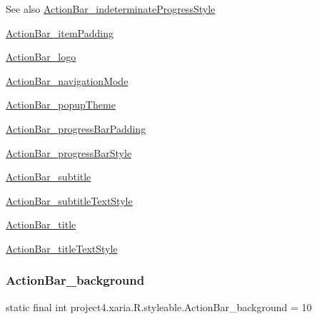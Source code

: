 \begin{DoxySeeAlso}{See also}
\hyperlink{classproject4_1_1xaria_1_1R_1_1styleable_a7b820690f429621509300f757ddbd3da}{Action\+Bar\+\_\+indeterminate\+Progress\+Style} 

\hyperlink{classproject4_1_1xaria_1_1R_1_1styleable_afead372bec08fa28b16df291eceff099}{Action\+Bar\+\_\+item\+Padding} 

\hyperlink{classproject4_1_1xaria_1_1R_1_1styleable_a29368a7dcfad1ef0f8e7537d44b3cf41}{Action\+Bar\+\_\+logo} 

\hyperlink{classproject4_1_1xaria_1_1R_1_1styleable_a8a75ec93401c4f373036ed6d0abe042e}{Action\+Bar\+\_\+navigation\+Mode} 

\hyperlink{classproject4_1_1xaria_1_1R_1_1styleable_af32e42a2ea26936b7608c41f68c9ae51}{Action\+Bar\+\_\+popup\+Theme} 

\hyperlink{classproject4_1_1xaria_1_1R_1_1styleable_a99f4af768ba3206b1224f0599aad5fd3}{Action\+Bar\+\_\+progress\+Bar\+Padding} 

\hyperlink{classproject4_1_1xaria_1_1R_1_1styleable_ae3f1ea6ff103725e559077f1effcb813}{Action\+Bar\+\_\+progress\+Bar\+Style} 

\hyperlink{classproject4_1_1xaria_1_1R_1_1styleable_a7cca6eb4000951d6b787beaf09c98f90}{Action\+Bar\+\_\+subtitle} 

\hyperlink{classproject4_1_1xaria_1_1R_1_1styleable_a88fa5db9b1092133d576b1174279baa1}{Action\+Bar\+\_\+subtitle\+Text\+Style} 

\hyperlink{classproject4_1_1xaria_1_1R_1_1styleable_a5d0e4c195dd446c70c4981931970d991}{Action\+Bar\+\_\+title} 

\hyperlink{classproject4_1_1xaria_1_1R_1_1styleable_a981a219de0af41bb112ba02e0268fb0b}{Action\+Bar\+\_\+title\+Text\+Style} 
\end{DoxySeeAlso}
\mbox{\label{classproject4_1_1xaria_1_1R_1_1styleable_ad5297d7335b655c3a7281371b07c92d4}} 
\subsubsection{\texorpdfstring{Action\+Bar\+\_\+background}{ActionBar\_background}}
{\footnotesize\ttfamily static final int project4.\+xaria.\+R.\+styleable.\+Action\+Bar\+\_\+background = 10\hspace{0.3cm}{\ttfamily [static]}}

